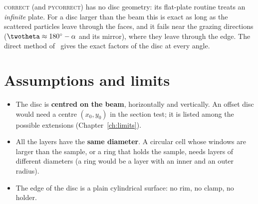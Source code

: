\begin{note}
\textsc{correct} (and \textsc{pycorrect}) has no disc geometry: its flat-plate routine  treats an \emph{infinite} plate.
For a disc larger than the beam this is exact as long as the scattered particles leave through the faces, and it fails near the
grazing directions ($\twotheta\approx 180^\circ-\alpha$ and its mirror), where they leave through the edge. The direct method of
\mcams\ gives the exact factors of the disc at every angle.
\end{note}

\section{Assumptions and limits}

\begin{itemize}
  \item The disc is \textbf{centred on the beam}, horizontally and vertically. An offset disc would need a centre $(x_0, y_0)$ in the
        section test; it is listed among the possible extensions (Chapter~\ref{ch:limits}).
  \item All the layers have the \textbf{same diameter}. A circular cell whose windows are larger than the sample, or a ring that holds
        the sample, needs layers of different diameters (a ring would be a layer with an inner and an outer radius).
  \item The edge of the disc is a plain cylindrical surface: no rim, no clamp, no holder.
\end{itemize}

